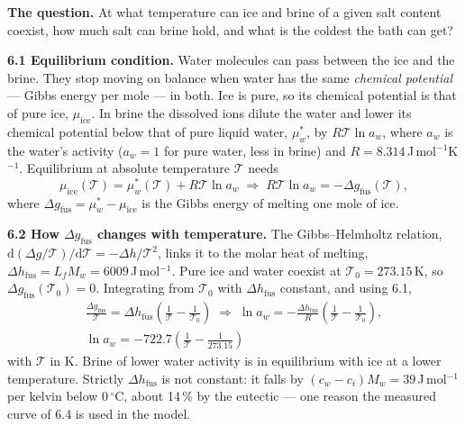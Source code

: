 \documentclass[11pt,a4paper]{article}
\newcommand{\dd}{\mathrm{d}}
\newcommand{\Tabs}{\mathcal{T}}
\newcommand{\dC}{\,{}^{\circ}\mathrm{C}}
\newcommand{\sub}[1]{\par\smallskip\noindent\textbf{#1}\enspace}
\begin{document}
\textbf{The question.} At what temperature can ice and brine of a given salt content coexist, how much
salt can brine hold, and what is the coldest the bath can get?

\sub{6.1 Equilibrium condition.} Water molecules can pass between the ice and the brine. They stop
moving on balance when water has the same \emph{chemical potential} --- Gibbs energy per mole --- in both.
Ice is pure, so its chemical potential is that of pure ice, $\mu_{\mathrm{ice}}$. In brine the dissolved
ions dilute the water and lower its chemical potential below that of pure liquid water, $\mu_w^*$, by
$R\Tabs\ln a_w$, where $a_w$ is the water's activity ($a_w = 1$ for pure water, less in brine) and
$R = 8.314$\,J\,mol$^{-1}$K$^{-1}$. Equilibrium at absolute temperature $\Tabs$ needs
\[
\mu_{\mathrm{ice}}(\Tabs) = \mu_w^*(\Tabs) + R\Tabs\ln a_w
\;\Rightarrow\;
R\Tabs\ln a_w = -\Delta g_{\mathrm{fus}}(\Tabs),
\]
where $\Delta g_{\mathrm{fus}} = \mu_w^* - \mu_{\mathrm{ice}}$ is the Gibbs energy of melting one mole of
ice.

\sub{6.2 How $\Delta g_{\mathrm{fus}}$ changes with temperature.} The Gibbs--Helmholtz relation,
$\dd(\Delta g/\Tabs)/\dd\Tabs = -\Delta h/\Tabs^2$, links it to the molar heat of melting,
$\Delta h_{\mathrm{fus}} = L_fM_w = 6009$\,J\,mol$^{-1}$. Pure ice and water coexist at
$\Tabs_0 = 273.15$\,K, so $\Delta g_{\mathrm{fus}}(\Tabs_0) = 0$. Integrating from $\Tabs_0$ with
$\Delta h_{\mathrm{fus}}$ constant, and using 6.1,
\begin{gather*}
\frac{\Delta g_{\mathrm{fus}}}{\Tabs} = \Delta h_{\mathrm{fus}}\left(\frac{1}{\Tabs}-\frac{1}{\Tabs_0}\right)
\;\Rightarrow\;
\ln a_w = -\frac{\Delta h_{\mathrm{fus}}}{R}\left(\frac{1}{\Tabs}-\frac{1}{\Tabs_0}\right),
\\
\ln a_w = -722.7\left(\frac{1}{\Tabs}-\frac{1}{273.15}\right)
\end{gather*}
with $\Tabs$ in K. Brine of lower water activity is in equilibrium with ice at a lower temperature. Strictly
$\Delta h_{\mathrm{fus}}$ is not constant: it falls by $(c_w - c_i)M_w = 39$\,J\,mol$^{-1}$ per kelvin below
$0\dC$, about 14\,\% by the eutectic --- one reason the measured curve of 6.4 is used in the model.
\end{document}

